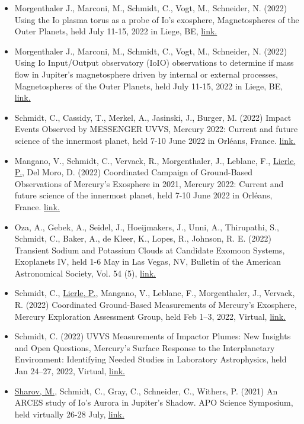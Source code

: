 \documentclass[12pt]{report}
\begin{document}
\begin{itemize}
   \item Morgenthaler J., Marconi, M., Schmidt, C., Vogt, M., Schneider, N. (2022) Using the Io plasma torus as a probe of Io's exosphere,  Magnetospheres of the Outer Planets, held July 11-15, 2022 in Liege, BE, \href{ https://www.mop.uliege.be/}{link.}
   \item Morgenthaler J., Marconi, M., Schmidt, C., Vogt, M., Schneider, N. (2022)  Using Io Input/Output observatory (IoIO) observations to determine if mass flow in Jupiter's magnetosphere driven by internal or external processes,  Magnetospheres of the Outer Planets, held July 11-15, 2022 in Liege, BE, \href{ https://www.mop.uliege.be/}{link.}
   \item Schmidt, C., Cassidy, T., Merkel, A., Jasinski, J., Burger, M. (2022) Impact Events Observed by MESSENGER UVVS, Mercury 2022: Current and future science of the innermost planet, held 7-10 June 2022 in Orl\'eans, France. \href{https://mercury2020.ias.u-psud.fr/main_1st.php}{link.} 
   \item Mangano, V., Schmidt, C., Vervack, R., Morgenthaler, J., Leblanc, F., \underline{Lierle, P.}, Del Moro, D. (2022) Coordinated Campaign of Ground-Based Observations of Mercury’s Exosphere in 2021, Mercury 2022: Current and future science of the innermost planet, held 7-10 June 2022 in Orl\'eans, France. \href{https://mercury2020.ias.u-psud.fr/main_1st.php}{link.} 
   \item Oza, A., Gebek, A., Seidel, J., Hoeijmakers, J., Unni, A., Thirupathi, S., Schmidt, C., Baker, A., de Kleer, K., Lopes, R., Johnson, R.  E. (2022) Transient Sodium and Potassium Clouds at Candidate Exomoon Systems, Exoplanets IV, held 1-6 May in Las Vegas, NV, Bulletin of the American Astronomical Society, Vol. 54 (5), \href{https://baas.aas.org/pub/2022n5i208p02}{link.} 
   \item Schmidt, C., \underline{Lierle, P.}, Mangano, V., Leblanc, F., Morgenthaler, J., Vervack, R. (2022) Coordinated Ground-Based Measurements of Mercury’s Exosphere, Mercury Exploration Assessment Group, held Feb 1–3, 2022, Virtual, \href{https://www.hou.usra.edu/meetings/mexagfebruary2022/eposter/9007.pdf}{link.} 
   \item Schmidt, C. (2022) UVVS Measurements of Impactor Plumes: New Insights and Open Questions, Mercury’s Surface Response to the Interplanetary Environment: Identifying Needed Studies in Laboratory Astrophysics, held Jan 24–27, 2022, Virtual, \href{https://meeting.psi.edu/mercurylab2022/}{link.} 
   \item \underline{Sharov, M.}, Schmidt, C., Gray, C., Schneider, C., Withers, P. (2021) An ARCES study of Io's Aurora in Jupiter’s Shadow. APO Science Symposium, held virtually 26-28 July, \href{ http://astronomy.nmsu.edu/aposcisymposium21/}{link.} 

\end{itemize}
\end{document}
